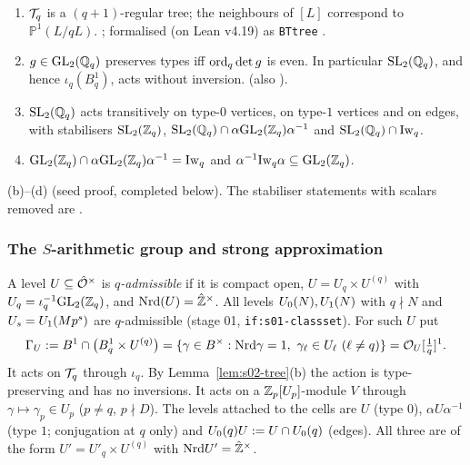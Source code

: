 \begin{lemma}\label{lem:s02-tree}
\begin{enumerate}[label=(\alph*)]
\item $\mathcal{T}_q$ is a $(q+1)$-regular tree; the neighbours of $[L]$ correspond to $\mathbb P^1(L/qL)$.
  \stcited{} ; formalised (on Lean v4.19) as \texttt{BTtree}
  .
\item $g\in\mathrm{GL}_2(\mathbb{Q}_q)$ preserves types iff $\mathrm{ord}_q\det g$ is even. In particular $\mathrm{SL}_2(\mathbb{Q}_q)$, and hence
  $\iota_q(B^1_q)$, acts without inversion. \stproved{} (also ).
\item $\mathrm{SL}_2(\mathbb{Q}_q)$ acts transitively on type-$0$ vertices, on type-$1$ vertices and on edges, with
  stabilisers $\mathrm{SL}_2(\mathbb{Z}_q)$, $\mathrm{SL}_2(\mathbb{Q}_q)\cap\alpha\mathrm{GL}_2(\mathbb{Z}_q)\alpha^{-1}$ and $\mathrm{SL}_2(\mathbb{Q}_q)\cap\mathrm{Iw}_q$.
\item $\mathrm{GL}_2(\mathbb{Z}_q)\cap\alpha\mathrm{GL}_2(\mathbb{Z}_q)\alpha^{-1}=\mathrm{Iw}_q$ and $\alpha^{-1}\mathrm{Iw}_q\alpha\subseteq\mathrm{GL}_2(\mathbb{Z}_q)$.
\end{enumerate}
(b)--(d) \stproved{} (seed proof, completed below). The stabiliser statements with scalars removed are
.
\end{lemma}

\subsubsection*{The $S$-arithmetic group and strong approximation}
\begin{definition}\label{def:s02-GU}
A level $U\subseteq\hat{\mathcal{O}}^\times$ is \emph{$q$-admissible} if it is compact open, $U=U_q\times U^{(q)}$ with
$U_q=\iota_q^{-1}\mathrm{GL}_2(\mathbb{Z}_q)$, and $\mathrm{Nrd}(U)=\hat{\mathbb{Z}}^\times$. All levels $U_0(N),U_1(N)$ with $q\nmid N$ and
$U_s=U_1(Mp^s)$ are $q$-admissible (stage 01, \texttt{if:s01-classset}).
For such $U$ put
\[\GU:=B^1\cap\big(B^1_q\times U^{(q)}\big)=\{\gamma\in B^\times:\Nrd\gamma=1,\ \gamma_\ell\in U_\ell\ (\ell\ne q)\}
=\cO_U[\tfrac1q]^1.\]
It acts on $\mathcal{T}_q$ through $\iota_q$. By Lemma~\ref{lem:s02-tree}(b) the action is type-preserving and has
no inversions. It acts on a $\mathbb{Z}_p[U_p]$-module $V$ through $\gamma\mapsto\gamma_p\in U_p$ ($p\ne q$, $p\nmid D$).
The levels attached to the cells are $U$ (type $0$), $\alpha U\alpha^{-1}$ (type $1$; conjugation at $q$
only) and $U_0(q)U:=U\cap U_0(q)$ (edges). All three are of the form $U'=U'_q\times U^{(q)}$ with
$\mathrm{Nrd} U'=\hat{\mathbb{Z}}^\times$.
\end{definition}

